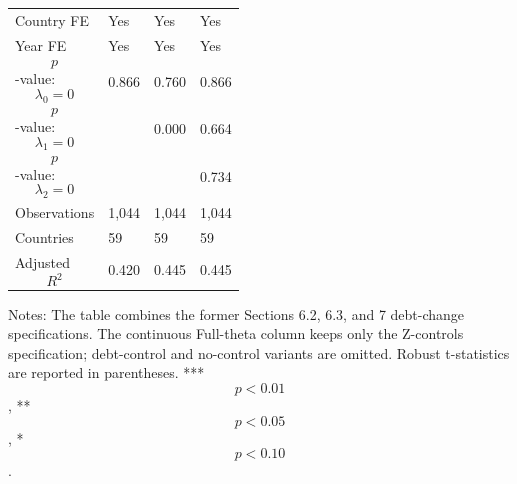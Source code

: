 \begin{table}[H]
\begin{threeparttable}
\begin{tabularx}{\textwidth}{lYYY}
Country FE & Yes & Yes & Yes \\
Year FE & Yes & Yes & Yes \\
$$p$$-value: $$\lambda_0=0$$ & 0.866 & 0.760 & 0.866 \\
$$p$$-value: $$\lambda_1=0$$ &  & 0.000 & 0.664 \\
$$p$$-value: $$\lambda_2=0$$ &  &  & 0.734 \\
Observations & 1,044 & 1,044 & 1,044 \\
Countries & 59 & 59 & 59 \\
Adjusted $$R^2$$ & 0.420 & 0.445 & 0.445 \\
\bottomrule
\end{tabularx}
\begin{tablenotes}[flushleft]\footnotesize
\item Notes: The table combines the former Sections 6.2, 6.3, and 7 debt-change specifications. The continuous Full-theta column keeps only the Z-controls specification; debt-control and no-control variants are omitted. Robust t-statistics are reported in parentheses. *** $$p<0.01$$, ** $$p<0.05$$, * $$p<0.10$$.
\end{tablenotes}
\end{threeparttable}
\end{table}
